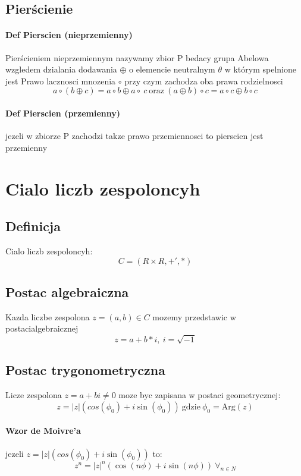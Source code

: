 \documentclass[a4paper]{article}
\begin{document}
\subsection{Pierścienie}
\paragraph{Def Pierscien (nieprzemienny)}
Pierścieniem nieprzemiennym nazywamy zbior P bedacy grupa Abelowa wzgledem dzialania dodawania $\oplus$ o elemencie neutralnym $\theta$ w którym spelnione jest Prawo lacznosci mnozenia $\circ$ przy czym zachodza oba prawa rodzielnosci
\begin{equation}
    a \circ (b \oplus c) = a \circ b \oplus a \circ \ c \ \text{oraz} \ (a \oplus b) \circ c = a \circ c \oplus b \circ c
\end{equation}
\paragraph{Def Pierscien (przemienny)}
jezeli w zbiorze P zachodzi takze prawo przemiennosci to pierscien jest przemienny
\section{Cialo liczb zespoloncyh}
\subsection{Definicja}
Cialo liczb zespoloncyh:
\begin{equation}
    C=(R\times R, +', * )
\end{equation}
\subsection{Postac algebraiczna}
Kazda liczbe zespolona $ z = (a,b) \in C $ mozemy przedstawic  w postacialgebraicznej
\begin{equation}
z = a + b * i , \ i = \sqrt{-1}
\end{equation}
\subsection{Postac trygonometryczna}
Licze zespolona $z = a + bi \ne 0$ moze byc zapisana w postaci geometrycznej:
\begin{equation}
    z = |z|(cos(\phi_0) + i\sin(\phi_0)) \ \text{gdzie} \ \phi_0 = \text{Arg}(z)
\end{equation}
\paragraph{Wzor de Moivre'a}
jezeli $    z = |z|(cos(\phi_0) + i\sin(\phi_0))$ to:
\begin{equation}
    z^{n} = |z|^{n}(\cos(n\phi)+ i\sin(n\phi)) \ \forall_{n \in N}
\end{equation}
\end{document}
